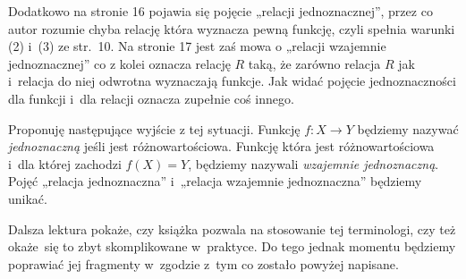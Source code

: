 \documentclass[a4paper,11pt]{article}
\begin{document}
Dodatkowo na stronie 16 pojawia się pojęcie „relacji jednoznacznej”,
przez co autor rozumie chyba relację która wyznacza pewną funkcję,
czyli spełnia warunki (2) i~(3) ze str.~10. Na stronie 17 jest zaś
mowa o „relacji wzajemnie jednoznacznej” co z kolei oznacza relację
$R$ taką, że zarówno relacja $R$ jak i~relacja do niej odwrotna
wyznaczają funkcje. Jak widać pojęcie jednoznaczności dla funkcji
i~dla relacji oznacza zupełnie coś innego.

Proponuję następujące wyjście z tej sytuacji. Funkcję $f: X \to Y$
będziemy nazywać \textit{jednoznaczną} jeśli jest różnowartościowa.
Funkcję która jest różnowartościowa i~dla której zachodzi
$f( X ) = Y$, będziemy nazywali \textit{wzajemnie jednoznaczną}. Pojęć
„relacja jednoznaczna” i~„relacja wzajemnie jednoznaczna” będziemy
unikać.

Dalsza lektura pokaże, czy książka pozwala na stosowanie tej
terminologi, czy też okaże~się to zbyt skomplikowane w~praktyce. Do
tego jednak momentu będziemy poprawiać jej fragmenty w~zgodzie z~tym
co zostało powyżej napisane.

\vspace{\spaceFour}





\newpage

\end{document}
